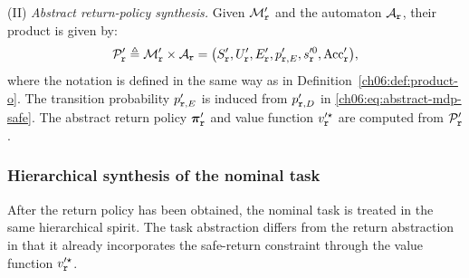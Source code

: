 (II) \emph{Abstract return-policy synthesis.}
Given \(\mathcal{M}'_{\textup{\texttt{r}}}\) and the automaton
\(\mathcal{A}_{\textup{\texttt{r}}}\), their product is given by:
\begin{equation}
\label{ch06:eq:abstract-safe-product}
\mathcal{P}'_{\textup{\texttt{r}}} \triangleq
\mathcal{M}'_{\textup{\texttt{r}}}
\times
\mathcal{A}_{\textup{\texttt{r}}}
=
\bigl(
S'_{\textup{\texttt{r}}},
U'_{\textup{\texttt{r}}},
E'_{\textup{\texttt{r}}},
p'_{\textup{\texttt{r}},E},
s'^{0}_{\textup{\texttt{r}}},
\mathrm{Acc}'_{\textup{\texttt{r}}}
\bigr),
\end{equation}
where the notation is defined in the same way as in
Definition~\ref{ch06:def:product-o}. The transition probability
\(p'_{\textup{\texttt{r}},E}\) is induced from
\(p'_{\textup{\texttt{r}},D}\) in \eqref{ch06:eq:abstract-mdp-safe}.
The abstract return policy
\(\boldsymbol{\pi}'_{\textup{\texttt{r}}}\) and value function
\(v'^{\star}_{\textup{\texttt{r}}}\) are computed from
\(\mathcal{P}'_{\textup{\texttt{r}}}\).

\subsubsection{Hierarchical synthesis of the nominal task}
\label{ch06:subsec:task-plan}

After the return policy has been obtained, the nominal task is treated in the
same hierarchical spirit. The task abstraction differs from the return
abstraction in that it already incorporates the safe-return constraint through
the value function \(v'^{\star}_{\textup{\texttt{r}}}\).

